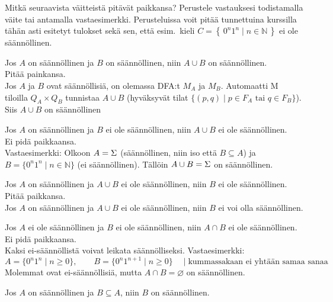\documentclass[12pt,a4paper]{article}
\newcommand{\set}[1]{\left\{\,#1\,\right\}}
\newcommand{\N}{\mathbb{N}}
\begin{document}
\pagebreak
{}

Mitkä seuraavista väitteistä pitävät paikkansa?
Perustele vastauksesi todistamalla väite tai antamalla vastaesimerkki.
Perusteluissa voit pitää tunnettuina kurssilla tähän asti
esitetyt tulokset sekä sen, että esim.\ kieli $C=\set{0^n1^n\mid n\in\N}$
ei ole säännöllinen.
\begin{kohta}
\item
Jos $A$ on säännöllinen ja $B$ on säännöllinen, niin
$A\cup B$ on säännöllinen.\\

Pitää painkansa. \\
Jos $A$ ja $B$ ovat säännöllisiä, on olemassa DFA:t $M_A$ ja $M_B$.
Automaatti M tiloilla $Q_A\times Q_B$ tunnistaa $A\cup B$ (hyväksyvät tilat
$\{(p,q)\mid p\in F_A \text{ tai } q\in F_B\}$). Siis $A\cup B$ on säännöllinen

\item %
Jos $A$ on säännöllinen ja $B$ ei ole säännöllinen, niin
$A\cup B$ ei ole säännöllinen.\\

Ei pidä paikkaansa.\\
Vastaesimerkki: Olkoon $A=\Sigma^{\*}$ (säännöllinen, niin iso
että $B\subseteq A$) ja $B=\{0^n1^n\mid n\in\mathbb{N}\}$
(ei säännöllinen). Tällöin $A\cup B=\Sigma^{\*}$ on säännöllinen.\\
\item %
Jos $A$ on säännöllinen ja $A\cup B$ ei ole säännöllinen,
niin $B$ ei ole säännöllinen.\\

Pitää paikkansa.\\
Jos $A$ on säännöllinen ja $A\cup B$ ei ole säännöllinen,
niin $B$ ei voi olla säännöllinen.\\

\item %
Jos $A$ ei ole säännöllinen ja $B$ ei ole säännöllinen,
niin $A\cap B$ ei ole säännöllinen.\\

Ei pidä paikkaansa.\\
Kaksi ei-säännöllistä voivat leikata säännölliseksi.
Vastaesimerkki:
\[
A=\{0^n1^n\mid n\ge 0\},\qquad
B=\{0^n1^{n+1}\mid n\ge 0\} \quad\mid \text{kummassakaan ei yhtään samaa sanaa}
\]
Molemmat ovat ei-säännöllisiä, mutta
$A\cap B=\varnothing$ on säännöllinen.\\
\item
Jos $A$ on säännöllinen ja $B\subseteq A$, niin $B$ on
säännöllinen.\\


\end{kohta}
\end{document}
